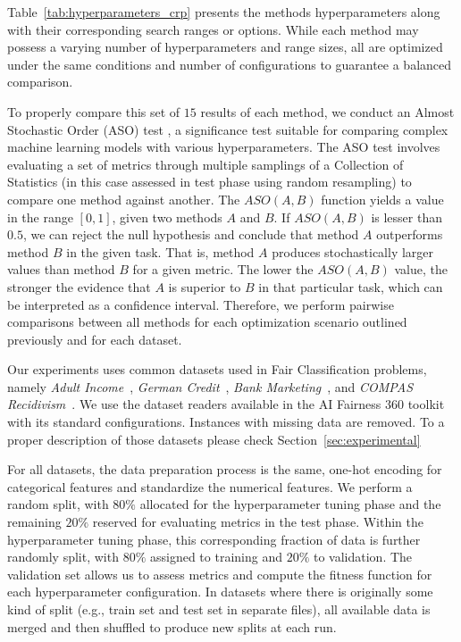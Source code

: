 Table~\ref{tab:hyperparameters_crp} presents the methods hyperparameters along with their corresponding search ranges or options. While each method may possess a varying number of hyperparameters and range sizes, all are optimized under the same conditions and number of configurations to guarantee a balanced comparison.

To properly compare this set of $15$ results of each method, we conduct an Almost Stochastic Order (ASO) test \citep{dror2019deep}, a significance test suitable for comparing complex machine learning models with various hyperparameters. The ASO test involves evaluating a set of metrics through multiple samplings of a Collection of Statistics (in this case assessed in test phase using random resampling) to compare one method against another. The $ASO(A, B)$ function yields a value in the range $[0, 1]$, given two methods $A$ and $B$. If $ASO(A, B)$ is lesser than $0.5$, we can reject the null hypothesis and conclude that method $A$ outperforms method $B$ in the given task. That is, method $A$ produces stochastically larger values than method $B$ for a given metric. The lower the $ASO(A, B)$ value, the stronger the evidence that $A$ is superior to $B$ in that particular task, which can be interpreted as a confidence interval. Therefore, we perform pairwise comparisons between all methods for each optimization scenario outlined previously and for each dataset.

Our experiments uses common datasets used in Fair Classification problems, namely \textit{Adult Income}~\citep{misc_adult_2}, \textit{German Credit}~\citep{misc_statlog_(german_credit_data)_144}, \textit{Bank Marketing}~\citep{misc_bank_marketing_222}, and \textit{COMPAS Recidivism}~\citep{misc_compas}. We use the dataset readers available in the AI Fairness 360 toolkit~\citep{aif360-oct-2018} with its standard configurations. Instances with missing data are removed. To a proper description of those datasets please check Section~\ref{sec:experimental}


For all datasets, the data preparation process is the same, one-hot encoding for categorical features and standardize the numerical features. We perform a random split, with $80\%$ allocated for the hyperparameter tuning phase and the remaining $20\%$ reserved for evaluating metrics in the test phase. Within the hyperparameter tuning phase, this corresponding fraction of data is further randomly split, with $80\%$ assigned to training and $20\%$ to validation. The validation set allows us to assess metrics and compute the fitness function for each hyperparameter configuration. In datasets where there is originally some kind of split (e.g., train set and test set in separate files), all available data is merged and then shuffled to produce new splits at each run.

